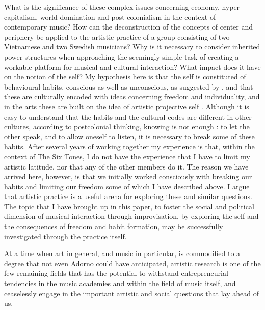 \documentclass[a4paper]{article}
\begin{document}
What is the significance of these complex issues concerning economy, hyper-capitalism, world domination and post-colonialism in the context of contemporary music? How can the deconstruction of the concepts of center and periphery be applied to the artistic practice of a group consisting of two Vietnamese and two Swedish musicians? Why is it necessary to consider inherited power structures when approaching the seemingly simple task of creating a workable platform for musical and cultural interaction? What impact does it have on the notion of the self? My hypothesis here is that the self is constituted of behavioural habits, conscious as well as unconscious, as suggested by \citet{bateson72:cyber-self}, and that these are culturally encoded with ideas concerning freedom and individuality, and in the arts these are built on the idea of artistic projective self \citep{frisk2013}. Although it is easy to understand that the habits and the cultural codes are different in other cultures, according to postcolonial thinking, knowing is not enough \citep[See e.g.][]{said2000,frisk-ost13}: to let the other speak, and to allow oneself to listen, it is necessary to break some of these habits. After several years of working together my experience is that, within the context of The Six Tones, I do not have the experience that I have to limit my artistic latitude, nor that any of the other members do it. The reason we have arrived here, however, is that we initially worked consciously with breaking our habits and limiting our freedom some of which I have described above. I argue that artistic practice is a useful arena for exploring these and similar questions. The topic that I have brought up in this paper, to foster the social and political dimension of musical interaction through improvisation, by exploring the self and the consequences of freedom and habit formation, may be successfully investigated through the practice itself. 

At a time when art in general, and music in particular, is commodified to a degree that not even Adorno could have anticipated, artistic research is one of the few remaining fields that has the potential to withstand entrepreneurial tendencies in the music academies and within the field of music itself, and ceaselessly engage in the important artistic and social questions that lay ahead of us. 

\end{document}
